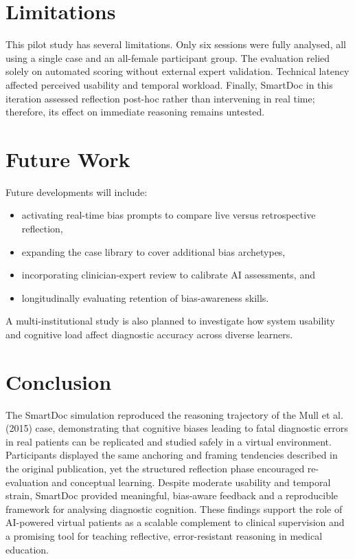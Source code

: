 \section{Limitations}

This pilot study has several limitations.
Only six sessions were fully analysed, all using a single case and an all-female
participant group.  
The evaluation relied solely on automated scoring without external expert validation.
Technical latency affected perceived usability and temporal workload.
Finally, SmartDoc in this iteration assessed reflection post-hoc rather than intervening
in real time; therefore, its effect on immediate reasoning remains untested.

\section{Future Work}

Future developments will include:

\begin{itemize}
  \item activating real-time bias prompts to compare live versus retrospective reflection,
  \item expanding the case library to cover additional bias archetypes,
  \item incorporating clinician-expert review to calibrate AI assessments, and
  \item longitudinally evaluating retention of bias-awareness skills.
\end{itemize}

A multi-institutional study is also planned to investigate how system usability and
cognitive load affect diagnostic accuracy across diverse learners.

\section{Conclusion}

The SmartDoc simulation reproduced the reasoning trajectory of the
Mull et al. (2015) case, demonstrating that cognitive biases leading to fatal
diagnostic errors in real patients can be replicated and studied safely in a
virtual environment.  
Participants displayed the same anchoring and framing tendencies described in
the original publication, yet the structured reflection phase encouraged
re-evaluation and conceptual learning.  
Despite moderate usability and temporal strain, SmartDoc provided meaningful,
bias-aware feedback and a reproducible framework for analysing diagnostic cognition.  
These findings support the role of AI-powered virtual patients as a scalable
complement to clinical supervision and a promising tool for teaching reflective,
error-resistant reasoning in medical education.

